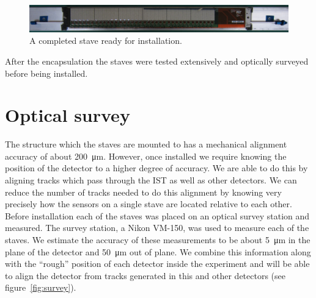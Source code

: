 \documentclass[1p,12pt]{elsarticle}
\begin{document}
\begin{figure}[h]
\begin{center}
\includegraphics[width=6.5in, keepaspectratio=true, angle=0]{graphics/full_stave.jpg}
\caption{A completed stave ready for installation.
\label{fig:full_stave}}
\end{center}
\end{figure}
%
After the encapsulation the staves were tested extensively and optically surveyed
before being installed.

\section{Optical survey}
The structure which the staves are mounted to has a mechanical alignment
accuracy of about \SI{200}{\micro\meter}. However, once installed we require knowing the
position of the detector to a higher degree of accuracy. We are able to do this
by aligning tracks which pass through the IST as well as other detectors. We
can reduce the number of tracks needed to do this alignment by knowing very
precisely how the sensors on a single stave are located relative to each other.
Before installation each of the staves was placed on an optical survey station
and measured. The survey station, a Nikon VM-150, was used to measure each of
the staves. We estimate the accuracy of these measurements to be about \SI{5}{\micro\meter} in
the plane of the detector and \SI{50}{\micro\meter} out of plane. We combine this information
along with the ``rough'' position of each detector inside the experiment and will
be able to align the detector from tracks generated in this and other detectors
(see figure~\ref{fig:survey}).
\end{document}

